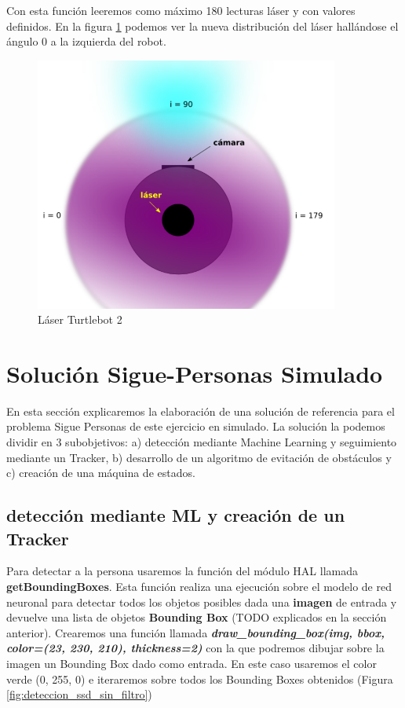 Con esta función leeremos como máximo 180 lecturas láser y con valores definidos. En la figura \ref{fig:vista_planta_turtlebot2} podemos ver la nueva distribución del láser hallándose el ángulo 0 a la izquierda del robot.

\begin{figure} [H]
  \begin{center}
    \includegraphics[width=10cm]{imagenes/vista-planta-turtlebot2.png}
  \end{center}
  \caption[Láser Turtlebot 2]{Láser Turtlebot 2}
  \label{fig:vista_planta_turtlebot2}
\end{figure}



\section{Solución Sigue-Personas Simulado}
\label{sec:sigue_personas_simulado}

En esta sección explicaremos la elaboración de una solución de referencia para el problema Sigue Personas de este ejercicio en simulado. La solución la podemos dividir en 3 subobjetivos: a) detección mediante Machine Learning y seguimiento mediante un Tracker, b) desarrollo de un algoritmo de evitación de obstáculos y c) creación de una máquina de estados.


\subsection{detección mediante ML y creación de un Tracker}
\label{subsec:ml_tracker}
Para detectar a la persona usaremos la función del módulo HAL llamada \textbf{getBoundingBoxes}. Esta función realiza una ejecución sobre el modelo de red neuronal para detectar todos los objetos posibles dada una \textbf{imagen} de entrada y devuelve una lista de objetos \textbf{Bounding Box} (TODO explicados en la sección anterior). Crearemos una función llamada \textbf{\textit{draw\_bounding\_box(img, bbox, color=(23, 230, 210), thickness=2)}} con la que podremos dibujar sobre la imagen un Bounding Box dado como entrada. En este caso usaremos el color verde (0, 255, 0) e iteraremos sobre todos los Bounding Boxes obtenidos (Figura \ref{fig:deteccion_ssd_sin_filtro})\\

